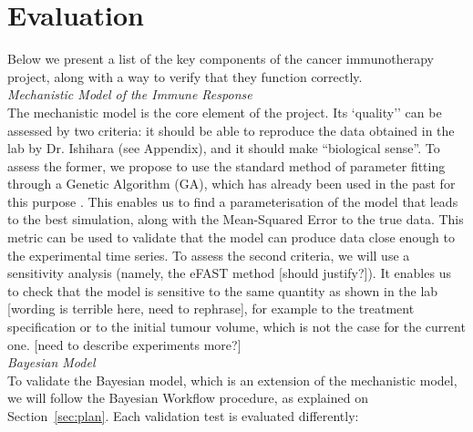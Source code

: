 \documentclass[11pt]{article}
\begin{document}
\section{Evaluation}
Below we present a list of the key components of the cancer immunotherapy project, along with a way to verify that they function correctly. \\[11pt]
%
\textit{Mechanistic Model of the Immune Response}\\[3pt] %
The mechanistic model is the core element of the project. Its `quality'' can be assessed by two criteria: it should be able to reproduce the data obtained in the lab by Dr. Ishihara (see Appendix), and it should make ``biological sense''. To assess the former, we propose to use the standard method of parameter fitting through a Genetic Algorithm (GA), which has already been used in the past for this purpose \cite{christian2}. This enables us to find a parameterisation of the model that leads to the best simulation, along with the Mean-Squared Error to the true data. This metric can be used to validate that the model can produce data close enough to the experimental time series. To assess the second criteria, we will use a sensitivity analysis (namely, the eFAST method [should justify?]). It enables us to check that the model is sensitive to the same quantity as shown in the lab [wording is terrible here, need to rephrase], for example to the treatment specification or to the initial tumour volume, which is not the case for the current one. [need to describe experiments more?]\\[11pt]
%
\textit{Bayesian Model}\\[3pt]
To validate the Bayesian model, which is an extension of the mechanistic model, we will follow the Bayesian Workflow procedure, as explained on Section~\ref{sec:plan}. Each validation test is evaluated differently:
\end{document}
